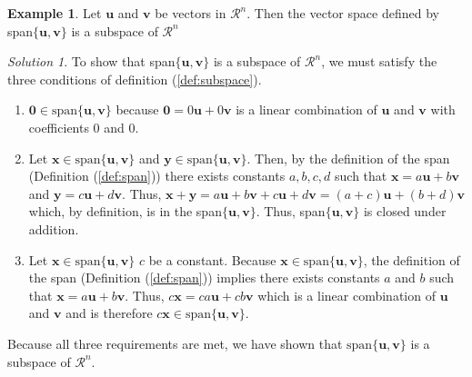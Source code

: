 \documentclass[
]{book}
\theoremstyle{definition}
\theoremstyle{definition}
\newtheorem{example}{Example}[chapter]
\theoremstyle{definition}
\theoremstyle{remark}
\newtheorem*{solution}{Solution}
\begin{document}
\begin{example}
\protect\hypertarget{exm:unnamed-chunk-164}{}{\label{exm:unnamed-chunk-164} }Let \(\mathbf{u}\) and \(\mathbf{v}\) be vectors in \(\mathcal{R}^n\). Then the vector space defined by span\(\{\mathbf{u}, \mathbf{v} \}\) is a subspace of \(\mathcal{R}^n\)
\end{example}

\begin{solution}

To show that span\(\{\mathbf{u}, \mathbf{v}\}\) is a subspace of \(\mathcal{R}^n\), we must satisfy the three conditions of definition (\ref{def:subspace}).

\begin{enumerate}
\def\labelenumi{\arabic{enumi})}
\item
  \(\mathbf{0} \in \mbox{span}\{\mathbf{u}, \mathbf{v}\}\) because \(\mathbf{0} = 0 \mathbf{u} + 0 \mathbf{v}\) is a linear combination of \(\mathbf{u}\) and \(\mathbf{v}\) with coefficients 0 and 0.
\item
  Let \(\mathbf{x} \in \mbox{span}\{\mathbf{u}, \mathbf{v}\}\) and \(\mathbf{y} \in \mbox{span}\{\mathbf{u}, \mathbf{v}\}\). Then, by the definition of the span (Definition (\ref{def:span})) there exists constants \(a, b, c, d\) such that \(\mathbf{x} = a \mathbf{u} + b \mathbf{v}\) and \(\mathbf{y} = c \mathbf{u} + d \mathbf{v}\). Thus, \(\mathbf{x} + \mathbf{y} = a \mathbf{u} + b \mathbf{v} + c \mathbf{u} + d \mathbf{v} = (a + c) \mathbf{u} + (b + d) \mathbf{v}\) which, by definition, is in the span\(\{\mathbf{u}, \mathbf{v}\}\). Thus, span\(\{\mathbf{u}, \mathbf{v}\}\) is closed under addition.
\item
  Let \(\mathbf{x} \in \mbox{span}\{\mathbf{u}, \mathbf{v}\}\) \(c\) be a constant. Because \(\mathbf{x} \in \mbox{span}\{\mathbf{u}, \mathbf{v}\}\), the definition of the span (Definition (\ref{def:span})) implies there exists constants \(a\) and \(b\) such that \(\mathbf{x} = a \mathbf{u} + b \mathbf{v}\). Thus, \(c\mathbf{x} = ca \mathbf{u} + cb \mathbf{v}\) which is a linear combination of \(\mathbf{u}\) and \(\mathbf{v}\) and is therefore \(c\mathbf{x} \in \mbox{span}\{\mathbf{u}, \mathbf{v}\}\).
\end{enumerate}

Because all three requirements are met, we have shown that \(\mbox{span}\{\mathbf{u}, \mathbf{v}\}\) is a subspace of \(\mathcal{R}^n\).

\end{solution}
\end{document}
